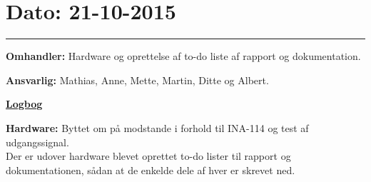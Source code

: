 \section{Dato: 21-10-2015}
\hrule
\textbf{Omhandler:} Hardware og oprettelse af to-do liste af rapport og dokumentation.

\textbf{Ansvarlig:} Mathias, Anne, Mette, Martin, Ditte og Albert.

\underline{\textbf{Logbog}}

\textbf{Hardware: }Byttet om på modstande i forhold til INA-114 og test af udgangssignal. 
\\
Der er udover hardware blevet oprettet to-do lister til rapport og dokumentationen, sådan at de enkelde dele af hver er skrevet ned.